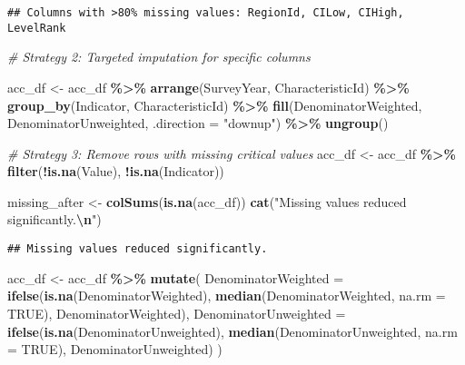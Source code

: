 \documentclass[
]{article}
\newenvironment{Shaded}{\begin{snugshade}}{\end{snugshade}}
\newcommand{\AttributeTok}[1]{\textcolor[rgb]{0.13,0.29,0.53}{#1}}
\newcommand{\CommentTok}[1]{\textcolor[rgb]{0.56,0.35,0.01}{\textit{#1}}}
\newcommand{\ConstantTok}[1]{\textcolor[rgb]{0.56,0.35,0.01}{#1}}
\newcommand{\FunctionTok}[1]{\textcolor[rgb]{0.13,0.29,0.53}{\textbf{#1}}}
\newcommand{\NormalTok}[1]{#1}
\newcommand{\OtherTok}[1]{\textcolor[rgb]{0.56,0.35,0.01}{#1}}
\newcommand{\SpecialCharTok}[1]{\textcolor[rgb]{0.81,0.36,0.00}{\textbf{#1}}}
\newcommand{\StringTok}[1]{\textcolor[rgb]{0.31,0.60,0.02}{#1}}
\begin{document}
\begin{verbatim}
## Columns with >80% missing values: RegionId, CILow, CIHigh, LevelRank
\end{verbatim}

\begin{Shaded}
\begin{Highlighting}[]
\CommentTok{\# Strategy 2: Targeted imputation for specific columns}

\NormalTok{acc\_df }\OtherTok{\textless{}{-}}\NormalTok{ acc\_df }\SpecialCharTok{\%\textgreater{}\%}
  \FunctionTok{arrange}\NormalTok{(SurveyYear, CharacteristicId) }\SpecialCharTok{\%\textgreater{}\%}
  \FunctionTok{group\_by}\NormalTok{(Indicator, CharacteristicId) }\SpecialCharTok{\%\textgreater{}\%}
  \FunctionTok{fill}\NormalTok{(DenominatorWeighted, DenominatorUnweighted, }\AttributeTok{.direction =} \StringTok{"downup"}\NormalTok{) }\SpecialCharTok{\%\textgreater{}\%}
  \FunctionTok{ungroup}\NormalTok{()}

\CommentTok{\# Strategy 3: Remove rows with missing critical values}
\NormalTok{acc\_df }\OtherTok{\textless{}{-}}\NormalTok{ acc\_df }\SpecialCharTok{\%\textgreater{}\%}
  \FunctionTok{filter}\NormalTok{(}\SpecialCharTok{!}\FunctionTok{is.na}\NormalTok{(Value), }\SpecialCharTok{!}\FunctionTok{is.na}\NormalTok{(Indicator))}

\NormalTok{missing\_after }\OtherTok{\textless{}{-}} \FunctionTok{colSums}\NormalTok{(}\FunctionTok{is.na}\NormalTok{(acc\_df))}
\FunctionTok{cat}\NormalTok{(}\StringTok{"Missing values reduced significantly.}\SpecialCharTok{\textbackslash{}n}\StringTok{"}\NormalTok{)}
\end{Highlighting}
\end{Shaded}

\begin{verbatim}
## Missing values reduced significantly.
\end{verbatim}

\begin{Shaded}
\begin{Highlighting}[]
\NormalTok{acc\_df }\OtherTok{\textless{}{-}}\NormalTok{ acc\_df }\SpecialCharTok{\%\textgreater{}\%}
  \FunctionTok{mutate}\NormalTok{(}
    \AttributeTok{DenominatorWeighted =} \FunctionTok{ifelse}\NormalTok{(}\FunctionTok{is.na}\NormalTok{(DenominatorWeighted), }\FunctionTok{median}\NormalTok{(DenominatorWeighted, }\AttributeTok{na.rm =} \ConstantTok{TRUE}\NormalTok{), DenominatorWeighted),}
    \AttributeTok{DenominatorUnweighted =} \FunctionTok{ifelse}\NormalTok{(}\FunctionTok{is.na}\NormalTok{(DenominatorUnweighted), }\FunctionTok{median}\NormalTok{(DenominatorUnweighted, }\AttributeTok{na.rm =} \ConstantTok{TRUE}\NormalTok{), DenominatorUnweighted)}
\NormalTok{  )}
\end{Highlighting}
\end{Shaded}
\end{document}
